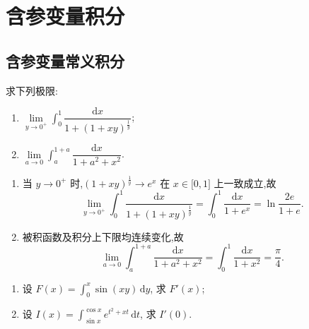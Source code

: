 \setcounter{chapter}{10}
\pagestyle{fancy}

\chapter{含参变量积分}


\section{含参变量常义积分}

\begin{example}
    求下列极限:
    \begin{enumerate}
        \item $\displaystyle \lim\limits_{y\to0^+}\int_0^1\dfrac{\mathrm{d}x}{1+(1+xy)^{\frac{1}{y}}}$;
        \item $\displaystyle \lim\limits_{a\to0}\int_a^{1+a}\dfrac{\mathrm{d}x}{1+a^2+x^2}$.
    \end{enumerate}
\end{example}
\exampleblank

\begin{solution}
    \leavevmode
    \begin{enumerate}
        \item 当 $y\to0^+$ 时,$(1+xy)^{\frac{1}{y}}\to e^x$ 在 $x\in\lbrack0,1\rbrack$ 上一致成立,故
              \[
                  \displaystyle\lim\limits_{y\to0^+}\int_0^1\dfrac{\mathrm{d}x}{1+(1+xy)^{\frac{1}{y}}}
                  =\int_0^1\dfrac{\mathrm{d}x}{1+e^x}
                  =\ln\dfrac{2e}{1+e}.
              \]
        \item 被积函数及积分上下限均连续变化,故
              \[
                  \displaystyle\lim\limits_{a\to0}\int_a^{1+a}\dfrac{\mathrm{d}x}{1+a^2+x^2}
                  =\int_0^1\dfrac{\mathrm{d}x}{1+x^2}=\dfrac{\pi}{4}.
              \]
    \end{enumerate}
\end{solution}

\begin{example}
    \begin{enumerate}
        \item 设 $F(x)=\displaystyle\int_0^x\sin(xy)\,\mathrm{d}y$, 求 $F'(x)$;
        \item 设 $I(x)=\displaystyle\int_{\sin x}^{\cos x}e^{t^2+xt}\,\mathrm{d}t$, 求 $I'(0)$.
    \end{enumerate}
\end{example}
\exampleblank

